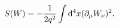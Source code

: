 \begin{equation}
S(W)= -\frac{1}{2 q^2} \int{\rm d}^4x(\partial_\mu 
W_\nu)^2.
\label{eq3}
\end{equation}

